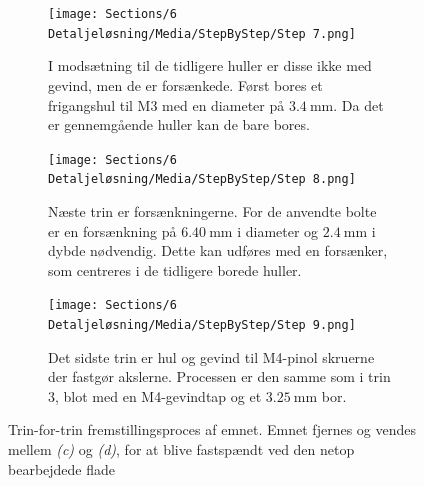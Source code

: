 \begin{figure}[H]
        \begin{subfigure}[t]{0.32\textwidth}
            \centering
            \texttt{[image: Sections/6 Detaljeløsning/Media/StepByStep/Step 7.png]}
            \caption{I modsætning til de tidligere huller er disse ikke med gevind, men de er forsænkede. Først bores et frigangshul til M3 med en diameter på $\SI{3.4}{\milli\meter}$. Da det er gennemgående huller kan de bare bores.}
            \label{fig:Step7}
        \end{subfigure}
        \hfill
        \begin{subfigure}[t]{0.32\textwidth}
            \centering
            \texttt{[image: Sections/6 Detaljeløsning/Media/StepByStep/Step 8.png]}
            \caption{Næste trin er forsænkningerne. For de anvendte bolte er en forsænkning på $\SI{6.40}{\milli\meter}$ i diameter og $\SI{2.4}{\milli\meter}$ i dybde nødvendig. Dette kan udføres med en forsænker, som centreres i de tidligere borede huller.}
            \label{fig:Step8}
        \end{subfigure}
        \hfill
        \begin{subfigure}[t]{0.32\textwidth}
            \centering
            \texttt{[image: Sections/6 Detaljeløsning/Media/StepByStep/Step 9.png]}
            \caption{Det sidste trin er hul og gevind til M4-pinol skruerne der fastgør akslerne. Processen er den samme som i trin 3, blot med en M4-gevindtap og et $\SI{3.25}{\milli\meter}$ bor.}
            \label{fig:Step9}
        \end{subfigure}
    
    \caption{Trin-for-trin fremstillingsproces af emnet. Emnet fjernes og vendes mellem \textit{(c)} og \textit{(d)}, for at blive fastspændt ved den netop bearbejdede flade}
    \label{fig:stepbystep}
\end{figure}





